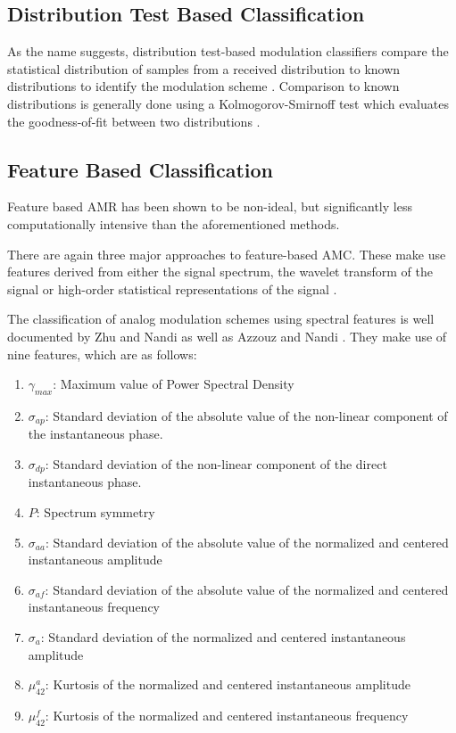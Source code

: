 \documentclass[10pt,twocolumn]{witseiepaper}
\begin{document}
	\subsection{Distribution Test Based Classification}
	As the name suggests, distribution test-based modulation classifiers compare the statistical distribution of samples from a received distribution to known distributions to identify the modulation scheme \cite{zhu2014automatic}. Comparison to known distributions is generally done using a Kolmogorov-Smirnoff test which evaluates the goodness-of-fit between two distributions \cite{urriza2011computationally}.


	\subsection{Feature Based Classification}
	\label{sec:features}
	Feature based AMR has been shown to be non-ideal, but significantly less computationally intensive \cite{zhu2014automatic} than the aforementioned methods.

	There are again three major approaches to feature-based AMC. These make use features derived from either the signal spectrum, the wavelet transform of the signal or high-order statistical representations of the signal \cite{zhu2014automatic}. 
	
	The classification of analog modulation schemes using spectral features is well documented by Zhu and Nandi \cite{zhu2014automatic} as well as Azzouz and Nandi \cite{azzouz2013automatic}. They make use of nine features, which are as follows:

	\begin{enumerate}
		\item $\gamma_{max}$: Maximum value of Power Spectral Density 
		\item $\sigma_{ap}$: Standard deviation of the absolute value of the non-linear component of the instantaneous phase.
		\item $\sigma_{dp}$: Standard deviation of the non-linear component of the direct instantaneous phase.
		\item $P$: Spectrum symmetry
		\item $\sigma_{aa}$: Standard deviation of the absolute value of the normalized and centered instantaneous amplitude
		\item $\sigma_{af}$: Standard deviation of the absolute value of the normalized and centered instantaneous frequency
		\item $\sigma_{a}$: Standard deviation of the normalized and centered instantaneous amplitude
		\item $\mu_{42}^{a}$: Kurtosis of the normalized and centered instantaneous amplitude
		\item $\mu_{42}^{f}$: Kurtosis of the normalized and centered instantaneous frequency
	\end{enumerate}
\end{document}

